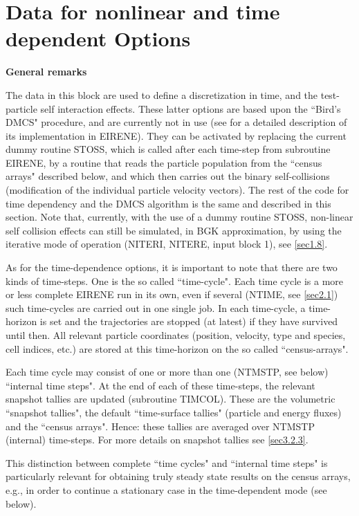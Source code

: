 \section{Data for nonlinear and time dependent Options} \label{sec2.13}

\textbf{General remarks}

\medskip

The data in this block are used to define a discretization in time, and the
test-particle self interaction effects.
%
These latter options are based upon the ``Bird's \ac{DMCS}" procedure, and are
currently not in use (see \cite{kn:Behringer} for a detailed description of its
implementation in EIRENE).
They can be activated by replacing the current dummy routine STOSS, which is
called after each time-step from subroutine EIRENE, by a routine that reads the
particle population from the ``census arrays" described below, and which then
carries out the binary self-collisions (modification of the individual particle
velocity vectors).
The rest of the code for time dependency and the \ac{DMCS} algorithm is the
same and described in this section.
Note that, currently, with the use of a dummy routine STOSS, non-linear self
collision effects can still be simulated, in \ac{BGK} approximation, by using
the iterative mode of operation (NITERI, NITERE, input block 1), see
\cref{sec1.8}.

As for the time-dependence options, it is important to note that there are two
kinds of time-steps.
One is the so called ``time-cycle".
Each time cycle is a more or less complete EIRENE run in its own, even if
several (NTIME, see \cref{sec2.1}) such time-cycles are carried out in one
single job.
In each time-cycle, a time-horizon is set and the trajectories are stopped (at
latest) if they have survived until then.
All relevant particle coordinates (position, velocity, type and species, cell
indices, etc.) are stored at this time-horizon on the so called
``census-arrays".

Each time cycle may consist of one or more than one (NTMSTP, see below)
``internal time steps".
At the end of each of these time-steps, the relevant snapshot tallies are
updated (subroutine TIMCOL).
These are the volumetric ``snapshot tallies", the default ``time-surface
tallies" (particle and energy fluxes) and the ``census arrays".
Hence: these tallies are averaged over NTMSTP (internal) time-steps.
For more details on snapshot tallies see \cref{sec3.2.3}.

This distinction between complete ``time cycles" and ``internal time steps" is
particularly relevant for obtaining truly steady state results on the census
arrays, e.g., in order to continue a stationary case in the time-dependent mode
(see below).

